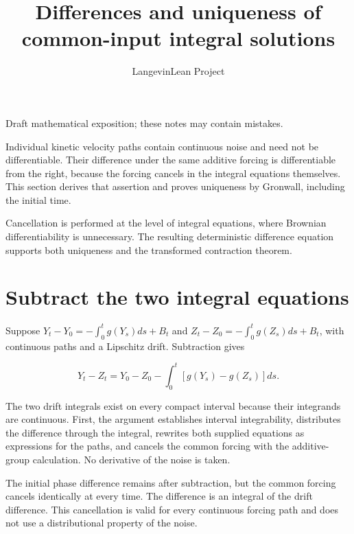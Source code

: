 \documentclass[11pt,a4paper]{article}
\title{\texorpdfstring{Differences and uniqueness of common-input integral solutions}{Differences and uniqueness of common-input integral solutions}}
\author{LangevinLean Project}
\date{}
\begin{document}
\maketitle
Draft mathematical exposition; these notes may contain mistakes.


Individual kinetic velocity paths contain continuous noise and need not be differentiable. Their difference under the same additive forcing is differentiable from the right, because the forcing cancels in the integral equations themselves. This section derives that assertion and proves uniqueness by Gronwall, including the initial time.



Cancellation is performed at the level of integral equations, where Brownian differentiability is unnecessary. The resulting deterministic difference equation supports both uniqueness and the transformed contraction theorem.


\section{\texorpdfstring{Subtract the two integral equations}{Subtract the two integral equations}}


Suppose \(Y_t-Y_0=-\int_0^t g(Y_s)ds+B_t\) and \(Z_t-Z_0=-\int_0^t g(Z_s)ds+B_t\), with continuous paths and a Lipschitz drift. Subtraction gives

\[Y_t-Z_t=Y_0-Z_0-\int_0^t[g(Y_s)-g(Z_s)]ds.\]

The two drift integrals exist on every compact interval because their integrands are continuous. First, the argument establishes interval integrability, distributes the difference through the integral, rewrites both supplied equations as expressions for the paths, and cancels the common forcing with the additive-group calculation. No derivative of the noise is taken.



The initial phase difference remains after subtraction, but the common forcing cancels identically at every time. The difference is an integral of the drift difference. This cancellation is valid for every continuous forcing path and does not use a distributional property of the noise.
\end{document}
